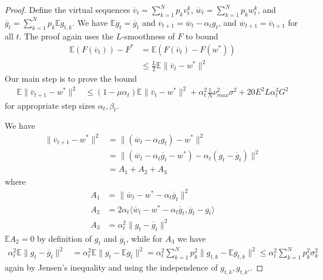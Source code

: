 \begin{proof}
Define the virtual sequences $\overline{v}_{t}=\sum_{k=1}^{N}p_{k}v_{t}^{k}$,
$\overline{w}_{t}=\sum_{k=1}^{N}p_{k}w_{t}^{k}$, and $\overline{g}_{t}=\sum_{k=1}^{N}p_{k}\mathbb{E}g_{t,k}$.
We have $\mathbb{E}g_{t}=\overline{g}_{t}$ and $\overline{v}_{t+1}=\overline{w}_{t}-\alpha_{t}g_{t}$,
and $\overline{w}_{t+1}=\overline{v}_{t+1}$ for all $t$. The proof
again uses the $L$-smoothness of $F$ to bound 
\begin{align*}
\mathbb{E}(F(\overline{v}_{t}))-F^{\ast} & =\mathbb{E}(F(\overline{v}_{t})-F(w^{\ast}))\\
& \leq\frac{L}{2}\mathbb{E}\|\overline{v}_{t}-w^{\ast}\|^{2}
\end{align*}
Our main step is to prove the bound
\begin{align*}
\mathbb{E}\|\overline{v}_{t+1}-w^{\ast}\|^{2} & \leq(1-\mu\alpha_{t})\mathbb{E}\|\overline{v}_{t}-w^{\ast}\|^{2}+\alpha_{t}^{2}\frac{1}{N}\nu_{max}^{2}\sigma^{2}+20E^{2}L\alpha_{t}^{3}G^{2}
\end{align*}
 for appropriate step sizes $\alpha_{t},\beta_{t}$.

We have 
\begin{align*}
\|\overline{v}_{t+1}-w^{\ast}\|^{2} & =\|(\overline{w}_{t}-\alpha_{t}g_{t})-w^{\ast}\|^{2}\\
& =\|(\overline{w}_{t}-\alpha_{t}\overline{g}_{t}-w^{\ast})-\alpha_{t}(g_{t}-\overline{g}_{t})\|^{2}\\
& =A_{1}+A_{2}+A_{3}
\end{align*}
where 
\begin{align*}
A_{1} & =\|\overline{w}_{t}-w^{\ast}-\alpha_{t}\overline{g}_{t}\|^{2}\\
A_{2} & =2\alpha_{t}\langle\overline{w}_{t}-w^{\ast}-\alpha_{t}\overline{g}_{t},\overline{g}_{t}-g_{t}\rangle\\
A_{3} & =\alpha_{t}^{2}\|g_{t}-\overline{g}_{t}\|^{2}
\end{align*}
$\mathbb{E}A_{2}=0$ by definition of $g_{t}$ and $\overline{g}_{t}$,
while for $A_{3}$ we have
\begin{align*}
\alpha_{t}^{2}\mathbb{E}\|g_{t}-\overline{g}_{t}\|^{2} & =\alpha_{t}^{2}\mathbb{E}\|g_{t}-\mathbb{E}g_{t}\|^{2}=\alpha_{t}^{2}\sum_{k=1}^{N}p_{k}^{2}\|g_{t,k}-\mathbb{E}g_{t,k}\|^{2}\leq\alpha_{t}^{2}\sum_{k=1}^{N}p_{k}^{2}\sigma_{k}^{2}
\end{align*}
again by Jensen's inequality and using the independence of $g_{t,k},g_{t,k'}$. 


\end{proof}
